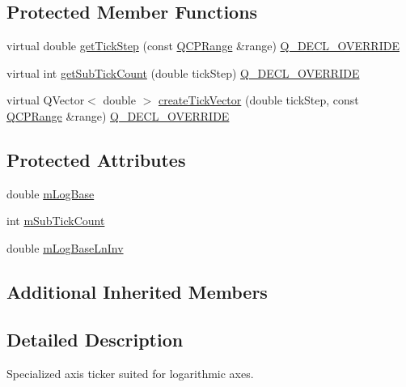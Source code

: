 \subsection*{Protected Member Functions}
\begin{DoxyCompactItemize}
\item 
virtual double \mbox{\hyperlink{class_q_c_p_axis_ticker_log_a57be974214a065d3247406331f02fa49}{get\+Tick\+Step}} (const \mbox{\hyperlink{class_q_c_p_range}{Q\+C\+P\+Range}} \&range) \mbox{\hyperlink{qcustomplot_8h_a42cc5eaeb25b85f8b52d2a4b94c56f55}{Q\+\_\+\+D\+E\+C\+L\+\_\+\+O\+V\+E\+R\+R\+I\+DE}}
\item 
virtual int \mbox{\hyperlink{class_q_c_p_axis_ticker_log_a352fef7ae68837acd26e35188aa86167}{get\+Sub\+Tick\+Count}} (double tick\+Step) \mbox{\hyperlink{qcustomplot_8h_a42cc5eaeb25b85f8b52d2a4b94c56f55}{Q\+\_\+\+D\+E\+C\+L\+\_\+\+O\+V\+E\+R\+R\+I\+DE}}
\item 
virtual Q\+Vector$<$ double $>$ \mbox{\hyperlink{class_q_c_p_axis_ticker_log_af8873a8d1d2b9392d8f7a73218c889ab}{create\+Tick\+Vector}} (double tick\+Step, const \mbox{\hyperlink{class_q_c_p_range}{Q\+C\+P\+Range}} \&range) \mbox{\hyperlink{qcustomplot_8h_a42cc5eaeb25b85f8b52d2a4b94c56f55}{Q\+\_\+\+D\+E\+C\+L\+\_\+\+O\+V\+E\+R\+R\+I\+DE}}
\end{DoxyCompactItemize}
\subsection*{Protected Attributes}
\begin{DoxyCompactItemize}
\item 
double \mbox{\hyperlink{class_q_c_p_axis_ticker_log_a4108bcc1cd68dcec54dc75667440d328}{m\+Log\+Base}}
\item 
int \mbox{\hyperlink{class_q_c_p_axis_ticker_log_a3d92b729bedbbbd34ee5f74565defd95}{m\+Sub\+Tick\+Count}}
\item 
double \mbox{\hyperlink{class_q_c_p_axis_ticker_log_aeba719bbeec39957f475ef89d6ae2fe7}{m\+Log\+Base\+Ln\+Inv}}
\end{DoxyCompactItemize}
\subsection*{Additional Inherited Members}


\subsection{Detailed Description}
Specialized axis ticker suited for logarithmic axes. 



